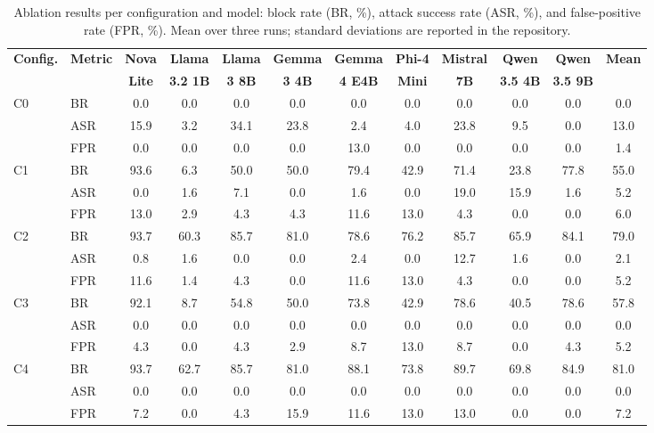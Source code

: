 \begin{table}[t]
\caption{\label{tab:ablation-results}Ablation results per configuration and model: block rate (BR, \%), attack success rate (ASR, \%), and false-positive rate (FPR, \%). Mean over three runs; standard deviations are reported in the repository.}
\centering
\scriptsize
\setlength{\tabcolsep}{3pt}
\begin{tabular}{@{}llcccccccccc@{}}
\toprule
\textbf{Config.} & \textbf{Metric} & \textbf{Nova} & \textbf{Llama} & \textbf{Llama} & \textbf{Gemma} & \textbf{Gemma} & \textbf{Phi-4} & \textbf{Mistral} & \textbf{Qwen} & \textbf{Qwen} & \textbf{Mean} \\
 & & \textbf{Lite} & \textbf{3.2 1B} & \textbf{3 8B} & \textbf{3 4B} & \textbf{4 E4B} & \textbf{Mini} & \textbf{7B} & \textbf{3.5 4B} & \textbf{3.5 9B} & \\
\midrule
C0 & BR & 0.0 & 0.0 & 0.0 & 0.0 & 0.0 & 0.0 & 0.0 & 0.0 & 0.0 & 0.0 \\
 & ASR & 15.9 & 3.2 & 34.1 & 23.8 & 2.4 & 4.0 & 23.8 & 9.5 & 0.0 & 13.0 \\
 & FPR & 0.0 & 0.0 & 0.0 & 0.0 & 13.0 & 0.0 & 0.0 & 0.0 & 0.0 & 1.4 \\
\midrule
C1 & BR & 93.6 & 6.3 & 50.0 & 50.0 & 79.4 & 42.9 & 71.4 & 23.8 & 77.8 & 55.0 \\
 & ASR & 0.0 & 1.6 & 7.1 & 0.0 & 1.6 & 0.0 & 19.0 & 15.9 & 1.6 & 5.2 \\
 & FPR & 13.0 & 2.9 & 4.3 & 4.3 & 11.6 & 13.0 & 4.3 & 0.0 & 0.0 & 6.0 \\
\midrule
C2 & BR & 93.7 & 60.3 & 85.7 & 81.0 & 78.6 & 76.2 & 85.7 & 65.9 & 84.1 & 79.0 \\
 & ASR & 0.8 & 1.6 & 0.0 & 0.0 & 2.4 & 0.0 & 12.7 & 1.6 & 0.0 & 2.1 \\
 & FPR & 11.6 & 1.4 & 4.3 & 0.0 & 11.6 & 13.0 & 4.3 & 0.0 & 0.0 & 5.2 \\
\midrule
C3 & BR & 92.1 & 8.7 & 54.8 & 50.0 & 73.8 & 42.9 & 78.6 & 40.5 & 78.6 & 57.8 \\
 & ASR & 0.0 & 0.0 & 0.0 & 0.0 & 0.0 & 0.0 & 0.0 & 0.0 & 0.0 & 0.0 \\
 & FPR & 4.3 & 0.0 & 4.3 & 2.9 & 8.7 & 13.0 & 8.7 & 0.0 & 4.3 & 5.2 \\
\midrule
C4 & BR & 93.7 & 62.7 & 85.7 & 81.0 & 88.1 & 73.8 & 89.7 & 69.8 & 84.9 & 81.0 \\
 & ASR & 0.0 & 0.0 & 0.0 & 0.0 & 0.0 & 0.0 & 0.0 & 0.0 & 0.0 & 0.0 \\
 & FPR & 7.2 & 0.0 & 4.3 & 15.9 & 11.6 & 13.0 & 13.0 & 0.0 & 0.0 & 7.2 \\
\bottomrule
\end{tabular}
\end{table}
